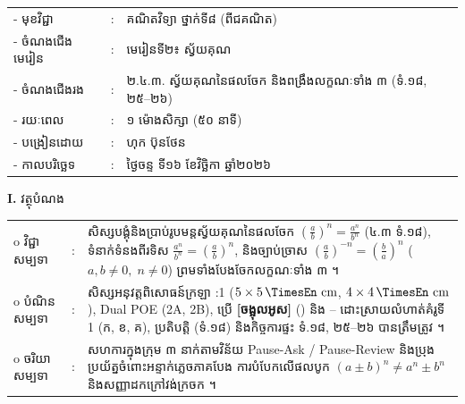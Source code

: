 \documentclass[a4paper,10pt]{article}
\newcommand{\wcirc}{{\CourierBullet\fontsize{9.5pt}{11pt}\selectfont o}}
\newcommand{\en}[1]{{\TimesEn #1}}
\newcommand{\unit}[1]{\,\text{\en{#1}}}
\newcommand{\cnum}[1]{{\fontsize{10.5pt}{12pt}\selectfont\ding{\numexpr181+#1\relax}}\hspace{0.15em}}
\begin{document}
{\renewcommand{\arraystretch}{0.98}
\hspace*{3.1cm}%
\begin{tabular}{@{}l l L{11.0cm}@{}}
  - \hspace{0.35cm} មុខវិជ្ជា & : & គណិតវិទ្យា ថ្នាក់ទី៨ (ពីជគណិត) \\
  - \hspace{0.35cm} ចំណងជើងមេរៀន & : & មេរៀនទី២៖ ស្វ័យគុណ \\
  - \hspace{0.35cm} ចំណងជើងរង & : & ២.៤.៣. ស្វ័យគុណនៃផលចែក និងពង្រឹងលក្ខណៈទាំង ៣ (ទំ.១៨, ២៥–២៦) \\
  - \hspace{0.35cm} រយៈពេល & : & ១ ម៉ោងសិក្សា (៥០ នាទី) \\
  - \hspace{0.35cm} បង្រៀនដោយ & : & ហុក ប៊ុនថែន \\
  - \hspace{0.35cm} កាលបរិច្ឆេទ & : & ថ្ងៃចន្ទ ទី១៦ ខែវិច្ឆិកា ឆ្នាំ២០២៦ \\
\end{tabular}

\vspace{2pt}

\textbf{I.} {\muol វត្ថុបំណង}\\[1pt]
\hspace*{0.55cm}%
\begin{tabular}{@{}l l L{14.2cm}@{}}
  \wcirc \hspace{0.25cm} វិជ្ជាសម្បទា & : & សិស្សបង្គុំនិងប្រាប់រូបមន្តស្វ័យគុណនៃផលចែក $\left(\frac{a}{b}\right)^n = \frac{a^n}{b^n}$ (៤.៣ ទំ.១៨), ទំនាក់ទំនងពីរទិស $\frac{a^n}{b^n} = \left(\frac{a}{b}\right)^n$, និងច្បាប់ច្រាស $\left(\frac{a}{b}\right)^{-n} = \left(\frac{b}{a}\right)^n$ ($a,b\neq 0,\; n\neq 0$) ព្រមទាំងបែងចែកលក្ខណៈទាំង ៣ ។ \\
  \wcirc \hspace{0.25cm} បំណិនសម្បទា & : & សិស្សអនុវត្តពិសោធន៍ក្រឡា \en{1:1} ($5\times 5\unit{cm}$, $4\times 4\unit{cm}$), \en{Dual POE (2A, 2B)}, ប្រើ \textbf{[ចង្អុលអូស]} (\en{[tracing]}) និង \cnum{1}--\cnum{5} ដោះស្រាយលំហាត់គំរូទី 1 (ក, ខ, គ), ប្រតិបត្តិ (ទំ.១៨) និងកិច្ចការផ្ទះ ទំ.១៨, ២៥–២៦ បានត្រឹមត្រូវ ។ \\
  \wcirc \hspace{0.25cm} ចរិយាសម្បទា & : & សហការក្នុងក្រុម ៣ នាក់តាមវិន័យ \en{Pause-Ask / Pause-Review} និងប្រុងប្រយ័ត្នចំពោះអន្ទាក់ភ្លេចភាគបែង ការបំបែកលើផលបូក $(a\pm b)^n \neq a^n\pm b^n$ និងសញ្ញាដកក្រៅវង់ក្រចក ។ \\
\end{tabular}

}
\end{document}
